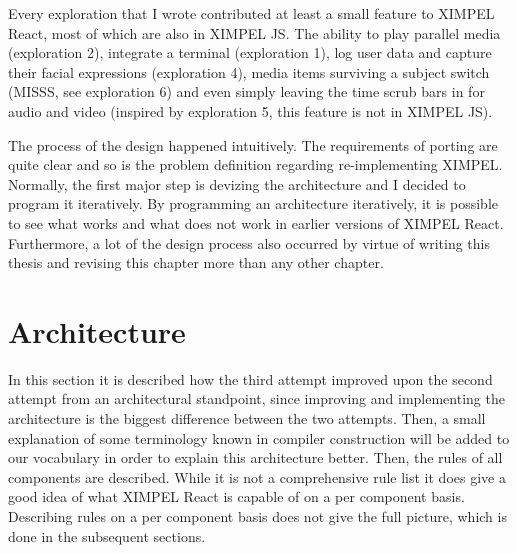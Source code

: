 Every exploration that I wrote contributed at least a small feature to XIMPEL React, most of which are also in XIMPEL JS. The ability to play parallel media (exploration 2), integrate a terminal (exploration 1), log user data and capture their facial expressions (exploration 4), media items surviving a subject switch (MISSS, see exploration 6) and even simply leaving the time scrub bars in for audio and video (inspired by exploration 5, this feature is not in XIMPEL JS). 

The process of the design happened intuitively. The requirements of porting are quite clear and so is the problem definition regarding re-implementing XIMPEL. Normally, the first major step is devizing the architecture and I decided to program it iteratively. By programming an architecture iteratively, it is possible to see what works and what does not work in earlier versions of XIMPEL React. Furthermore, a lot of the design process also occurred by virtue of writing this thesis and revising this chapter more than any other chapter.

\section{Architecture}
In this section it is described how the third attempt improved upon the second attempt from an architectural standpoint, since improving and implementing the architecture is the biggest difference between the two attempts. Then, a small explanation of some terminology known in compiler construction will be added to our vocabulary in order to explain this architecture better. Then, the rules of all components are described. While it is not a comprehensive rule list it does give a good idea of what XIMPEL React is capable of on a per component basis. Describing rules on a per component basis does not give the full picture, which is done in the subsequent sections.

